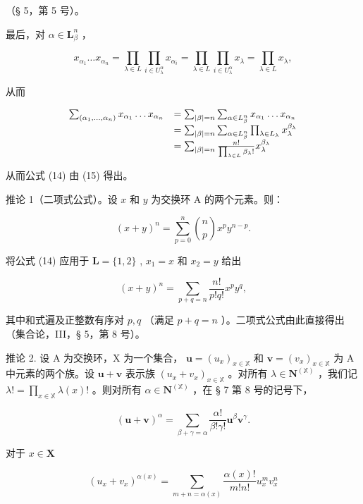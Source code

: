 （§ 5，第 5 号）。

最后，对 \(\alpha \in \mathbf{L}_{\beta}^{n}\) ，

\[
x _ {\alpha_ {1}} \dots x _ {\alpha_ {n}} = \prod_ {\lambda \in L} \prod_ {i \in U _ {\lambda} ^ {\alpha}} x _ {\alpha_ {i}} = \prod_ {\lambda \in L} \prod_ {i \in U _ {\lambda} ^ {\alpha}} x _ {\lambda} = \prod_ {\lambda \in L} x _ {\lambda},
\]

从而

\[
\begin{array}{r l} \sum_ {(\alpha_ {1}, \dots , \alpha_ {n})} x _ {\alpha_ {1}} \dots x _ {\alpha_ {n}} & = \sum_ {| \beta | = n} \sum_ {\alpha \in L _ {\beta} ^ {n}} x _ {\alpha_ {1}} \dots x _ {\alpha_ {n}} \\ & = \sum_ {| \beta | = n} \sum_ {\alpha \in L _ {\beta} ^ {n}} \prod_ {\lambda \in L _ {\lambda}} x _ {\lambda} ^ {\beta_ {\lambda}} \\ & = \sum_ {| \beta | = n} \frac {n !}{\prod_ {\lambda \in L} \beta_ {\lambda} !} x _ {\lambda} ^ {\beta_ {\lambda}} \end{array}
\]

从而公式 (14) 由 (15) 得出。

推论 1（二项式公式）。设 \(x\) 和 \(y\) 为交换环 A 的两个元素。则：

\[
(x + y) ^ {n} = \sum_ {p = 0} ^ {n} \binom {n} {p} x ^ {p} y ^ {n - p}.
\]

将公式 (14) 应用于 \(\mathbf{L} = \{1,2\}\) , \(x_{1} = x\) 和 \(x_{2} = y\) 给出

\[
(x + y) ^ {n} = \sum_ {p + q = n} \frac {n !}{p ! q !} x ^ {p} y ^ {q},
\]

其中和式遍及正整数有序对 \(p, q\) （满足 \(p + q = n\) ）。二项式公式由此直接得出（集合论，III，§ 5，第 8 号）。

推论 2. 设 A 为交换环，X 为一个集合， \(\mathbf{u} = (u_x)_{x \in \mathbb{X}}\) 和 \(\mathbf{v} = (v_x)_{x \in \mathbb{X}}\) 为 A 中元素的两个族。设 \(\mathbf{u} + \mathbf{v}\) 表示族 \((u_x + v_x)_{x \in \mathbb{X}}\) 。对所有 \(\lambda \in \mathbf{N}^{(\mathbb{X})}\) ，我们记 \(\lambda! = \prod_{x \in \mathbb{X}} \lambda(x)!\) 。则对所有 \(\alpha \in \mathbf{N}^{(\mathbb{X})}\) ，在 § 7 第 8 号的记号下，

\[
(\mathbf {u} + \mathbf {v}) ^ {\alpha} = \sum_ {\beta + \gamma = \alpha} \frac {\alpha !}{\beta ! \gamma !} \mathbf {u} ^ {\beta} \mathbf {v} ^ {\gamma}.
\]

对于 \(x\in \mathbf{X}\)

\[
(u _ {x} + v _ {x}) ^ {\alpha (x)} = \sum_ {m + n = \alpha (x)} \frac {\alpha (x) !}{m ! n !} u _ {x} ^ {m} v _ {x} ^ {n}
\]

